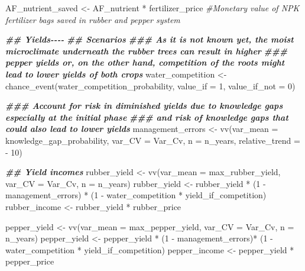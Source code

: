 \documentclass[
]{article}
\newenvironment{Shaded}{\begin{snugshade}}{\end{snugshade}}
\newcommand{\AttributeTok}[1]{\textcolor[rgb]{0.77,0.63,0.00}{#1}}
\newcommand{\CommentTok}[1]{\textcolor[rgb]{0.56,0.35,0.01}{\textit{#1}}}
\newcommand{\DecValTok}[1]{\textcolor[rgb]{0.00,0.00,0.81}{#1}}
\newcommand{\DocumentationTok}[1]{\textcolor[rgb]{0.56,0.35,0.01}{\textbf{\textit{#1}}}}
\newcommand{\FunctionTok}[1]{\textcolor[rgb]{0.00,0.00,0.00}{#1}}
\newcommand{\NormalTok}[1]{#1}
\newcommand{\OtherTok}[1]{\textcolor[rgb]{0.56,0.35,0.01}{#1}}
\newcommand{\SpecialCharTok}[1]{\textcolor[rgb]{0.00,0.00,0.00}{#1}}
\begin{document}
\begin{Shaded}
\begin{Highlighting}[]
\NormalTok{AF\_nutrient\_saved }\OtherTok{\textless{}{-}}\NormalTok{ AF\_nutrient }\SpecialCharTok{*}\NormalTok{ fertilizer\_price  }\CommentTok{\#Monetary value of NPK fertilizer bags saved in rubber and pepper system  }


\DocumentationTok{\#\# Yields{-}{-}{-}{-}}
 \DocumentationTok{\#\# Scenarios}
  \DocumentationTok{\#\#\# As it is not known yet, the moist microclimate underneath the rubber trees can result in higher }
  \DocumentationTok{\#\#\# pepper yields or, on the other hand, competition of the roots might lead to lower yields of both crops}
\NormalTok{  water\_competition }\OtherTok{\textless{}{-}} \FunctionTok{chance\_event}\NormalTok{(water\_competition\_probability, }\AttributeTok{value\_if =} \DecValTok{1}\NormalTok{, }\AttributeTok{value\_if\_not =} \DecValTok{0}\NormalTok{)}
  
  \DocumentationTok{\#\#\# Account for risk in diminished yields due to knowledge gaps especially at the initial phase}
  \DocumentationTok{\#\#\# and risk of knowledge gaps that could also lead to lower yields}
\NormalTok{  management\_errors }\OtherTok{\textless{}{-}} \FunctionTok{vv}\NormalTok{(}\AttributeTok{var\_mean =}\NormalTok{ knowledge\_gap\_probability, }\AttributeTok{var\_CV =}\NormalTok{ Var\_Cv,}
                          \AttributeTok{n =}\NormalTok{ n\_years, }\AttributeTok{relative\_trend =} \SpecialCharTok{{-}} \DecValTok{10}\NormalTok{)}
  
  \DocumentationTok{\#\# Yield incomes}
\NormalTok{  rubber\_yield }\OtherTok{\textless{}{-}} \FunctionTok{vv}\NormalTok{(}\AttributeTok{var\_mean =}\NormalTok{ max\_rubber\_yield, }\AttributeTok{var\_CV =}\NormalTok{ Var\_Cv, }\AttributeTok{n =}\NormalTok{ n\_years)}
\NormalTok{  rubber\_yield }\OtherTok{\textless{}{-}}\NormalTok{ rubber\_yield }\SpecialCharTok{*}\NormalTok{ (}\DecValTok{1} \SpecialCharTok{{-}}\NormalTok{ management\_errors) }\SpecialCharTok{*}\NormalTok{ (}\DecValTok{1} \SpecialCharTok{{-}}\NormalTok{ water\_competition }\SpecialCharTok{*}\NormalTok{ yield\_if\_competition)}
\NormalTok{  rubber\_income }\OtherTok{\textless{}{-}}\NormalTok{ rubber\_yield }\SpecialCharTok{*}\NormalTok{ rubber\_price}
    
\NormalTok{  pepper\_yield }\OtherTok{\textless{}{-}} \FunctionTok{vv}\NormalTok{(}\AttributeTok{var\_mean =}\NormalTok{ max\_pepper\_yield, }\AttributeTok{var\_CV =}\NormalTok{ Var\_Cv, }\AttributeTok{n =}\NormalTok{ n\_years)}
\NormalTok{  pepper\_yield }\OtherTok{\textless{}{-}}\NormalTok{ pepper\_yield }\SpecialCharTok{*}\NormalTok{ (}\DecValTok{1} \SpecialCharTok{{-}}\NormalTok{ management\_errors)}\SpecialCharTok{*}\NormalTok{ (}\DecValTok{1} \SpecialCharTok{{-}}\NormalTok{ water\_competition }\SpecialCharTok{*}\NormalTok{ yield\_if\_competition)}
\NormalTok{  pepper\_income }\OtherTok{\textless{}{-}}\NormalTok{ pepper\_yield }\SpecialCharTok{*}\NormalTok{ pepper\_price}
  


\end{Highlighting}
\end{Shaded}
\end{document}
